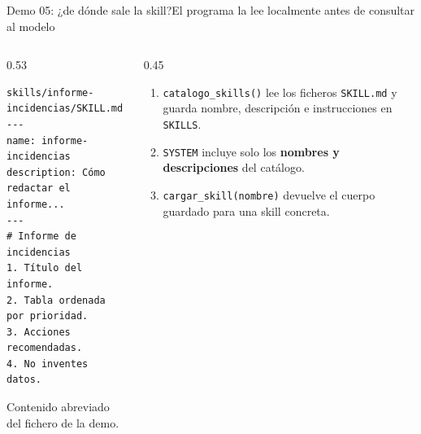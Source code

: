 \begin{frame}[fragile]{Demo 05: ¿de dónde sale la skill?}{El programa la lee localmente antes de consultar al modelo}
	\begin{columns}[T]
		\begin{column}{0.53\textwidth}
			\begin{lstlisting}[language={}]
skills/informe-incidencias/SKILL.md
---
name: informe-incidencias
description: Cómo redactar el informe...
---
# Informe de incidencias
1. Título del informe.
2. Tabla ordenada por prioridad.
3. Acciones recomendadas.
4. No inventes datos.
\end{lstlisting}
			{\scriptsize Contenido abreviado del fichero de la demo.}
		\end{column}
		\begin{column}{0.45\textwidth}
			\footnotesize
			\begin{enumerate}
				\item \texttt{catalogo\_skills()} lee los ficheros \texttt{SKILL.md} y guarda nombre, descripción e instrucciones en \texttt{SKILLS}.
				\item \texttt{SYSTEM} incluye solo los \textbf{nombres y descripciones} del catálogo.
				\item \texttt{cargar\_skill(nombre)} devuelve el cuerpo guardado para una skill concreta.
			\end{enumerate}
		\end{column}
	\end{columns}
\end{frame}

